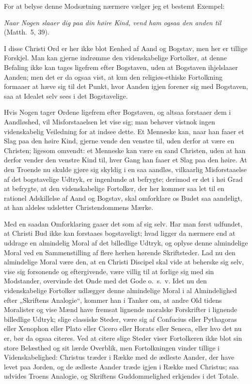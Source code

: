 \documentclass[12pt,a4paper]{book}
\newcommand{\opage}[1]{\marginnote{\footnotesize\textit{[#1]}}}
\begin{document}
For at belyse denne Modsætning nærmere vælger jeg et bestemt Exempel:

\emph{Naar Nogen slaaer dig paa din høire Kind, vend ham ogsaa den anden til}
(Matth.\ 5, 39).

\opage{69} I disse Christi Ord er her ikke blot Eenhed af Aand og Bogstav, men her er
tillige Forskjel. Man kan gjerne indrømme den videnskabelige Fortolker, at
denne Befaling ikke kan tages ligefrem efter Bogstaven, uden at Bogstaven
ihjelslaaer Aanden; men det er da ogsaa vist, at kun den religiøs-ethiske
Fortolkning formaaer at hæve sig til det Punkt, hvor Aanden igjen forener sig
med Bogstaven, saa at Idealet selv sees i det Bogstavelige.

Hvis Nogen tager Ordene ligefrem efter Bogstaven, og altsaa forstaaer dem i
Aandløshed, vil Misforstaaelsen let vise sig; man behøver vistnok ingen
videnskabelig Veiledning for at indsee dette. Et Menneske kan, naar han faaer
et Slag paa den høire Kind, gjerne vende den venstre til, uden derfor at være
en Christen; ligesom omvendt: et Menneske kan være en sand Christen, uden at
han derfor vender den venstre Kind til, hver Gang han faaer et Slag paa den
høire. At den Troende nu skulde gjøre sig skyldig i en saa aandløs,
vilkaarlig Misforstaaelse af det bogstavelige Udtryk, er ingenlunde at
befrygte; derimod er det i høi Grad at befrygte, at den videnskabelige
Fortolker, der her kommer saa let til en rationel Adskillelse af Aand og
Bogstav, skal omforklare os Budet saa aandeligt, at han aldeles udsletter
Christendommens Mærke.

Med en saadan Omforklaring gaaer det som af sig selv. Har man først udfundet,
at Christi Bud ikke kan forstaaes bogstaveligt; hvad ligger da nærmere end at
uddrage en almindelig Moral af det billedlige Udtryk, og oplyse denne
almindelige Moral ved en Sammenstilling af flere herhen hørende Skriftsteder.
Lad nu den almindelige Moral være den, at en Christi Discipel skal vide at
beherske sig selv, vise sig forsonende og eftergivende, være villig til at
forlige sig med sin Modstander, overvinde det Onde med det Gode o.\ s.\ v.
Idet nu den videnskabelige Fortolker udlægger denne almindelige Moral i al
Almindelighed efter „Skriftens Analogie“, kommer han i Tanker om, at andre
Old\-%
\opage{70}tidens Moralister og vise Mænd have fremsat lignende moralske Forskrifter i
lignende billedlige Udtryk; slige classiske Steder, være sig af Confucius
eller Pythagoras eller Xenophon eller Plato eller Cicero eller Horats eller
Seneca, eller hvo det nu er, bør da ogsaa citeres. Ved at citere slige Steder
viser Fortolkeren ikke blot sin store Belæsthed og sit lærde Overblik, men
Fortolkningen vinder tillige i Videnskabelighed: Christus træder i Række med
de ædleste Aander, der have levet paa Jorden, og de ædleste Aander træde
igjen i Række med Christus; saa udvides Troens Analogie, og Skriftens
Guddommelighed erkjendes i det Totale.
\end{document}

